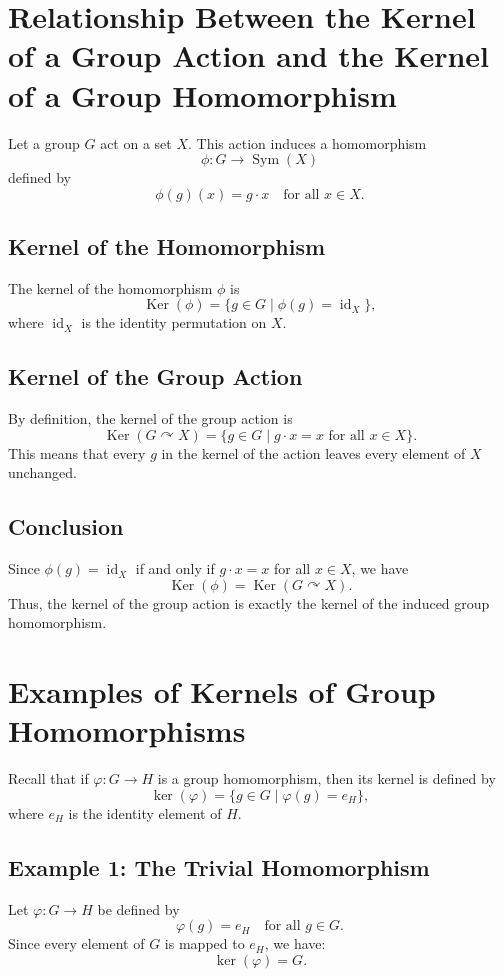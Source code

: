 \documentclass[12pt]{article}
\theoremstyle{definition} %
\theoremstyle{plain} %
\begin{document}
\section*{Relationship Between the Kernel of a Group Action and the Kernel of a Group Homomorphism}

Let a group \( G \) act on a set \( X \). This action induces a homomorphism
\[
\phi: G \to \operatorname{Sym}(X)
\]
defined by
\[
\phi(g)(x) = g \cdot x \quad \text{for all } x \in X.
\]

\subsection*{Kernel of the Homomorphism}
The kernel of the homomorphism \(\phi\) is
\[
\operatorname{Ker}(\phi) = \{ g \in G \mid \phi(g) = \operatorname{id}_X \},
\]
where \(\operatorname{id}_X\) is the identity permutation on \(X\).

\subsection*{Kernel of the Group Action}
By definition, the kernel of the group action is
\[
\operatorname{Ker}(G \curvearrowright X) = \{ g \in G \mid g\cdot x = x \text{ for all } x \in X \}.
\]
This means that every \(g\) in the kernel of the action leaves every element of \(X\) unchanged.

\subsection*{Conclusion}
Since \(\phi(g) = \operatorname{id}_X\) if and only if \(g \cdot x = x\) for all \(x \in X\), we have
\[
\operatorname{Ker}(\phi) = \operatorname{Ker}(G \curvearrowright X).
\]
Thus, the kernel of the group action is exactly the kernel of the induced group homomorphism.

\section*{Examples of Kernels of Group Homomorphisms}

Recall that if \(\varphi: G \to H\) is a group homomorphism, then its kernel is defined by
\[
\ker(\varphi) = \{ g \in G \mid \varphi(g) = e_H \},
\]
where \(e_H\) is the identity element of \(H\).

\subsection*{Example 1: The Trivial Homomorphism}
Let \( \varphi: G \to H \) be defined by
\[
\varphi(g) = e_H \quad \text{for all } g \in G.
\]
Since every element of \(G\) is mapped to \(e_H\), we have:
\[
\ker(\varphi) = G.
\]
\end{document}
